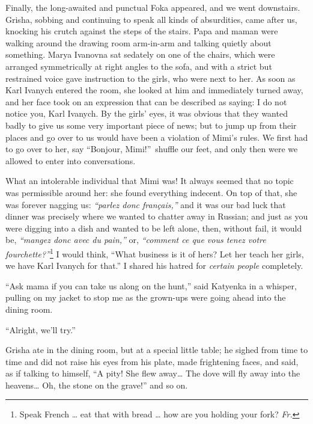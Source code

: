 Finally, the long-awaited and punctual Foka appeared, and we went downstairs. Grisha, sobbing and continuing to speak all kinds of absurdities, came after us, knocking his crutch against the steps of the stairs. Papa and maman were walking around the drawing room arm-in-arm and talking quietly about something. Marya Ivanovna sat sedately on one of the chairs, which were arranged symmetrically at right angles to the sofa, and with a strict but restrained voice gave instruction to the girls, who were next to her.  As soon as Karl Ivanych entered the room, she looked at him and immediately turned away, and her face took on an expression that can be described as saying: I do not notice you, Karl Ivanych. By the girls' eyes, it was obvious that they wanted badly to give us some very important piece of news; but to jump up from their places and go over to us would have been a violation of Mimi's rules. We first had to go over to her, say ``Bonjour, Mimi!''~shuffle our feet, and only then were we allowed to enter into conversations.

What an intolerable individual that Mimi was! It always seemed that no topic was permissible around her: she found everything indecent. On top of that, she was forever nagging us: \textit{``parlez donc fran\c cais,''} and it was our bad luck that dinner was precisely where we wanted to chatter away in Russian; and just as you were digging into a dish and wanted to be left alone, then, without fail, it would be, \textit{``mangez donc avec du pain,''} or, \textit{``comment ce que vous tenez votre fourchette?''}\footnote{Speak French \ldots{} eat that with bread \ldots{} how are you holding your fork? \textit{Fr.}} I would think, ``What business is it of hers? Let her teach her girls, we have Karl Ivanych for that.'' I shared his hatred for \emph{certain people} completely. %

``Ask mama if you can take us along on the hunt,'' said Katyenka in a whisper, pulling on my jacket to stop me as the grown-ups were going ahead into the dining room. %

``Alright, we'll try.'' %

Grisha ate in the dining room, but at a special little table; he sighed from time to time and did not raise his eyes from his plate, made frightening faces, and said, as if talking to himself, ``A pity! She flew away\ldots{} The dove will fly away into the heavens\ldots{} Oh, the stone on the grave!'' and so on. %

